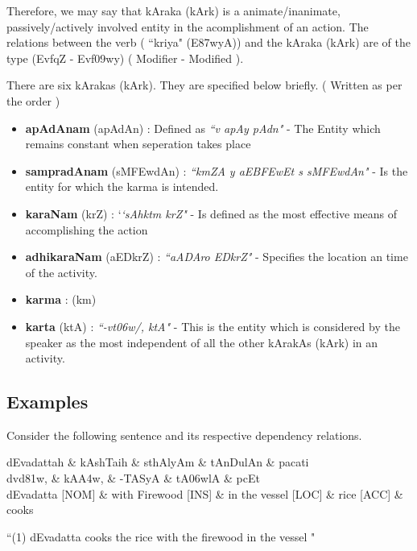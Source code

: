 \documentclass[twoside]{article}
\begin{document}
Therefore, we may say that kAraka ({\dn kArk}) is a animate/inanimate, passively/actively involved entity in the acomplishment of an action. The relations between the verb ( ``kriya" ({\dn E\387wyA})) and the kAraka ({\dn kArk}) are of the type ({\dn Evf\?qZ {\rs -\re} Evf\?\309wy}) ( Modifier - Modified ).

There are six kArakas ({\dn kArk}). They are specified below briefly. ( Written as per the order )

  \begin{itemize}
    \item \textbf{apAdAnam} ({\dn apAdAn}) :  Defined as \textit{``{\dn {}\5v apAy\? pAdn}"} - The Entity which remains constant when seperation takes place
    \item \textbf{sampradAnam} ({\dn sM\3FEwdAn}) : \textit{``{\dn km\0ZA y aEB\3FEw\4Et s sM\3FEwdAn}"} - Is the entity for which the karma is intended. 
    \item \textbf{karaNam} ({\dn krZ}) : `\textit{`{\dn sAhktm krZ}"} - Is defined as the most effective means of accomplishing the action
    \item \textbf{adhikaraNam} ({\dn aEDkrZ}) : \textit{``{\dn aADAro EDkrZ}"} - Specifies the location an time of the activity.
    \item \textbf{karma} : ({\dn km\0}) 
    \item \textbf{karta} ({\dn ktA\0}) : \textit{``{\dn -vt\306w/, ktA\0}"} - This is the entity which is considered by the speaker as the most independent of all the other kArakAs ({\dn kArk}) in an activity.
  \end{itemize}

\subsection{Examples}
Consider the following sentence and its respective dependency relations.

\hypertarget{fig1}{}
\begin{center}
\begin{dependency}[arc edge, arc angle=80, text only label, label style={above}]
   \begin{deptext}[column sep=1em]
      dEvadattah \& kAshTaih \& sthAlyAm \& tAnDulAn \& pacati \\
      {\dn d\?vd\381w,} \& {\dn kA\3A4w\4,} \& {\dn -TASyA} \& {\dn tA\306wlA} \& {\dn pcEt} \\
      dEvadatta [NOM] \& with Firewood [INS] \& in the vessel [LOC] \& rice [ACC]  \& cooks \\
   \end{deptext}
   
\end{dependency} 

 ``(1) dEvadatta cooks the rice with the firewood in the vessel " 
 

\end{center}
\end{document}
